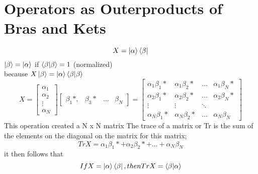 \documentclass{book}
\begin{document}
\section{Operators as Outerproducts of Bras and Kets}
$$X=\ket{\alpha} \bra{\beta}$$
$\ket{\beta} = \ket{\alpha}$ if $\braket{\beta}{\beta} = 1$ (normalized) \\
because $X\ket{\beta} = \ket{\alpha}\bra{\beta}\ket{\beta}$
$$X = \begin{bmatrix}
	\alpha_1 \\ \alpha_2 \\ \vdots \\ \alpha_N
\end{bmatrix}
\begin{bmatrix}
	\beta_1*, & \beta_3* &  \hdots & \beta_N
\end{bmatrix}
=
\begin{bmatrix}
	\alpha_1\beta_1* & \alpha_1\beta_2* & \hdots & \alpha_1\beta_N* \\
	\alpha_2\beta_1* & \alpha_2\beta_2* & \hdots & \alpha_2\beta_N* \\
	\vdots & \vdots &  \ddots \\
	\alpha_N\beta_1* & \alpha_N\beta_2* & \hdots & \alpha_N\beta_N
\end{bmatrix}
$$
This operation created a N x N matrix
The trace of a matrix or Tr is the sum of the elements on the diagonal on the matrix for this matrix;
$$Tr X = \alpha_1\beta_1* + \alpha_2\beta_2* + \hdots + \alpha_N \beta_N $$
it then follows that
$$If X =\ket{\alpha}\bra{\beta}, then Tr X = \braket{\beta}{\alpha}$$
\end{document}
